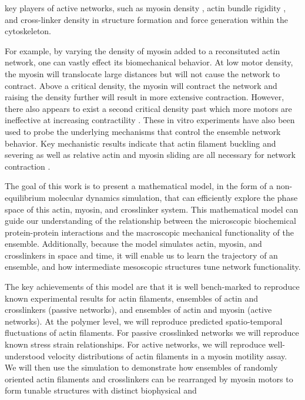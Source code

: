 \documentclass[12pt]{article}
\begin{document}
key players of active networks, such as myosin density \cite{murrell2012}, actin bundle rigidity \cite{murrell2012},
and cross-linker density\cite{murrell2014} in structure formation and force generation within the cytoskeleton.  
\par
For example, by varying the density of myosin added to a reconsituted actin network, one can vastly effect its biomechanical
behavior. At low
motor density, the myosin will translocate large distances but will not cause the network to contract\cite{burov2013}. Above a
critical density, the myosin will contract the network and raising the density further will result in more extensive
contraction. However, there also appears to exist a second critical density past which more motors are ineffective 
at increasing contractility \cite{murrell2014}. These in vitro experiments have also been used to probe the underlying
mechanisms that control the ensemble network behavior. 
Key mechanistic results indicate that actin filament buckling and severing as well as relative actin and myosin sliding
are all necessary for network contraction \cite{murrell2012, murrell2014}.
\par
The goal of this work is to present a mathematical model, in the form of a non-equilibrium molecular dynamics
simulation, that can efficiently explore the phase space of this actin, myosin, and crosslinker system.  
This mathematical model can guide our understanding of the relationship between
the microscopic biochemical protein-protein interactions and the macroscopic mechanical functionality of the ensemble. Additionally,
because the model simulates actin, myosin, and crosslinkers in space and time, it will enable us to learn the trajectory
of an ensemble, and how intermediate mesoscopic structures tune network functionality.
\par
The key achievements of this model are that it is well bench-marked to reproduce known experimental results for actin
filaments, ensembles of actin and crosslinkers (passive networks), and ensembles of actin and myosin 
(active networks). 
At the polymer level, we will reproduce predicted spatio-temporal fluctuations of actin filaments. 
For passive crosslinked networks we will reproduce known stress strain
relationships. For active networks, we will reproduce well-understood velocity distributions of actin
filaments in a myosin motility assay. We will then use the simulation to demonstrate how ensembles of randomly oriented
actin filaments and crosslinkers can be rearranged by myosin motors to form tunable structures with distinct biophysical and
\end{document}
